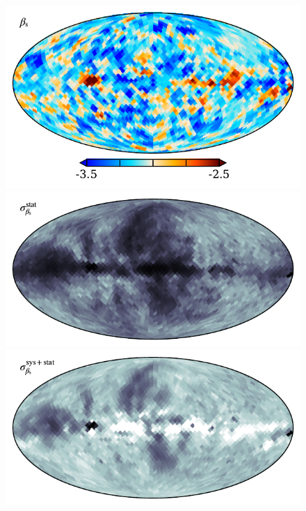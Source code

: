 \documentclass[twocolumn]{../../common/aa}
\begin{document}
\begin{figure}
	\centering
	\includegraphics[width=\columnwidth]{figures/beta_n0016_mu.pdf}\\
	\includegraphics[width=\columnwidth]{figures/beta_n0016_sd_samp.pdf}\\
	\includegraphics[width=\columnwidth]{figures/beta_n0016_sd_stat_inst.pdf}\\

\end{figure}
\end{document}
